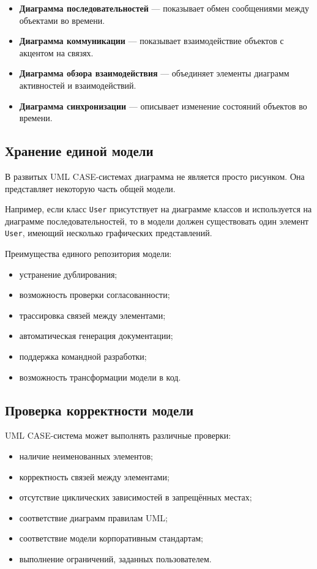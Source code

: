 \documentclass[12pt,a4paper]{article}
\begin{document}
\begin{itemize}
    \item \textbf{Диаграмма последовательностей} --- показывает обмен сообщениями между объектами во времени.
    \item \textbf{Диаграмма коммуникации} --- показывает взаимодействие объектов с акцентом на связях.
    \item \textbf{Диаграмма обзора взаимодействия} --- объединяет элементы диаграмм активностей и взаимодействий.
    \item \textbf{Диаграмма синхронизации} --- описывает изменение состояний объектов во времени.
\end{itemize}

\subsection{Хранение единой модели}

В развитых UML CASE-системах диаграмма не является просто рисунком. Она представляет некоторую часть общей модели.

Например, если класс \texttt{User} присутствует на диаграмме классов и используется на диаграмме последовательностей, то в модели должен существовать один элемент \texttt{User}, имеющий несколько графических представлений.

Преимущества единого репозитория модели:
\begin{itemize}
    \item устранение дублирования;
    \item возможность проверки согласованности;
    \item трассировка связей между элементами;
    \item автоматическая генерация документации;
    \item поддержка командной разработки;
    \item возможность трансформации модели в код.
\end{itemize}

\subsection{Проверка корректности модели}

UML CASE-система может выполнять различные проверки:
\begin{itemize}
    \item наличие неименованных элементов;
    \item корректность связей между элементами;
    \item отсутствие циклических зависимостей в запрещённых местах;
    \item соответствие диаграмм правилам UML;
    \item соответствие модели корпоративным стандартам;
    \item выполнение ограничений, заданных пользователем.
\end{itemize}
\end{document}
